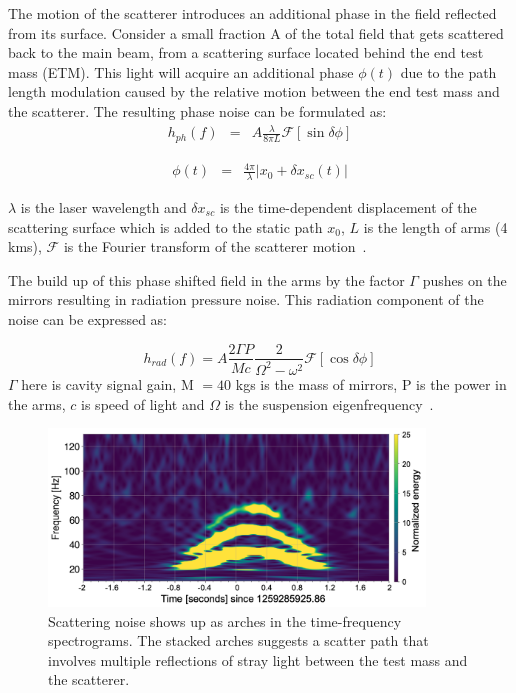\documentclass[12pt]{iopart}
\begin{document}
The motion of the scatterer introduces an additional phase in the field reflected from its surface. Consider a small fraction A of the total field that gets scattered back to the main beam, from a scattering surface located behind the end test mass (ETM). This light will acquire an additional phase ${\phi}(t)$ due to the path length modulation caused by the relative motion between the end test mass and the scatterer. The resulting phase noise can be formulated as:
\begin{eqnarray}
      h_{ph}(f) & = & A\frac{{\lambda}}{8{\pi}L}\mathcal{F}\left[\sin{\delta{\phi}}\right] \label{eq:1}
\end{eqnarray}

\begin{eqnarray}
    {\phi}(t) & = & \frac{4{\pi}}{{\lambda}}\left|{ x_{0} + {\delta} x_{sc}(t)}\right| \label{eq:2}
\end{eqnarray}
    
${\lambda}$ is the laser wavelength and  $\delta x_{sc}$ is the time-dependent displacement of the scattering surface which is added to the static path $x_{0}$, $L$ is the length of arms (4 kms), $\mathcal{F}$ is the Fourier transform of the scatterer motion~\cite{scatvirgo,vaj_scat}. 
\par
The build up of this phase shifted field in the arms by the factor ${\Gamma}$ pushes on the mirrors resulting in radiation pressure noise. This radiation component of the noise can be expressed as:


\begin{equation}
    h_{rad}(f) = A\frac{2{\Gamma P}}{Mc}\frac{2}{\Omega^2 - \omega^2} \mathcal{F}\left[\cos{\delta{\phi}}\right] \label{rad_eqn}
\end{equation}
${\Gamma}$ here is cavity signal gain, M $= 40$ kgs is the mass of mirrors, P is the power in the arms, $c$ is speed of light and ${\Omega}$ is the suspension eigenfrequency~\cite{Ottaway:12}.
\begin{figure}[h]
    \centering
    \includegraphics[width=10cm]{scatindarmlrs1.png}
    \caption{Scattering noise shows up as arches in the time-frequency spectrograms. The stacked arches suggests a scatter path that involves multiple reflections of stray light between the test mass and the scatterer.}
    \label{fig:scat}
\end{figure}
\end{document}
